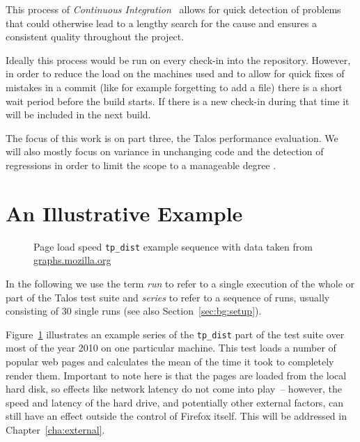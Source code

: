 This process of \emph{Continuous Integration}~\citep{fowler_continuous_2006}
allows for quick detection of problems that could otherwise lead to a lengthy
search for the cause and ensures a consistent quality throughout the project.

Ideally this process would be run on every check-in into the repository.
However, in order to reduce the load on the machines used and to allow for
quick fixes of mistakes in a commit (like for example forgetting to add a
file) there is a short wait period before the build starts. If there is a new
check-in during that time it will be included in the next build.

The focus of this work is on part three, the Talos performance evaluation. We
will also mostly focus on variance in unchanging code and the detection of
regressions in order to limit the scope to a manageable degree
\citep{ocallahan_private_2010}.

\section{An Illustrative Example} %
\label{sec:bg:example}

\begin{figure}[tpb]
    \centering
    
    \caption[\texttt{tp\_dist} example sequence]{Page load speed \texttt{tp\_dist} example sequence with data taken from \url{graphs.mozilla.org}}
    \label{fig:bg:tpdistperf}
\end{figure}

In the following we use the term \emph{run} to refer to a single execution of
the whole or part of the Talos test suite and \emph{series} to refer to a
sequence of runs, usually consisting of 30 single runs (see also
Section~\ref{sec:bg:setup}).

Figure~\ref{fig:bg:tpdistperf} illustrates an example series of the
\texttt{tp\_dist} part of the test suite over most of the year 2010 on one
particular machine. This test loads a number of popular web pages and
calculates the mean of the time it took to completely render them. Important
to note here is that the pages are loaded from the local hard disk, so effects
like network latency do not come into play~-- however, the speed and latency
of the hard drive, and potentially other external factors, can still have an
effect outside the control of Firefox itself. This will be addressed in
Chapter~\ref{cha:external}.

